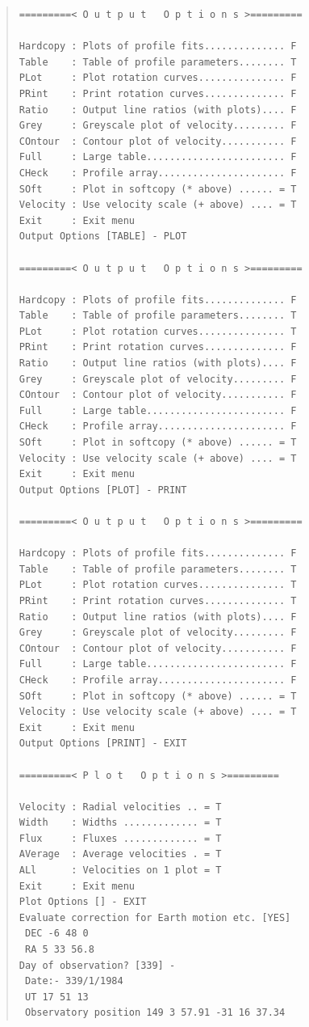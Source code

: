 \documentclass[11pt,twoside]{article}
\begin{document}
\begin{quote}\begin{verbatim}
=========< O u t p u t   O p t i o n s >=========

Hardcopy : Plots of profile fits.............. F
Table    : Table of profile parameters........ T
PLot     : Plot rotation curves............... F
PRint    : Print rotation curves.............. F
Ratio    : Output line ratios (with plots).... F
Grey     : Greyscale plot of velocity......... F
COntour  : Contour plot of velocity........... F
Full     : Large table........................ F
CHeck    : Profile array...................... F
SOft     : Plot in softcopy (* above) ...... = T
Velocity : Use velocity scale (+ above) .... = T
Exit     : Exit menu
Output Options [TABLE] - PLOT

=========< O u t p u t   O p t i o n s >=========

Hardcopy : Plots of profile fits.............. F
Table    : Table of profile parameters........ T
PLot     : Plot rotation curves............... T
PRint    : Print rotation curves.............. F
Ratio    : Output line ratios (with plots).... F
Grey     : Greyscale plot of velocity......... F
COntour  : Contour plot of velocity........... F
Full     : Large table........................ F
CHeck    : Profile array...................... F
SOft     : Plot in softcopy (* above) ...... = T
Velocity : Use velocity scale (+ above) .... = T
Exit     : Exit menu
Output Options [PLOT] - PRINT

=========< O u t p u t   O p t i o n s >=========

Hardcopy : Plots of profile fits.............. F
Table    : Table of profile parameters........ T
PLot     : Plot rotation curves............... T
PRint    : Print rotation curves.............. T
Ratio    : Output line ratios (with plots).... F
Grey     : Greyscale plot of velocity......... F
COntour  : Contour plot of velocity........... F
Full     : Large table........................ F
CHeck    : Profile array...................... F
SOft     : Plot in softcopy (* above) ...... = T
Velocity : Use velocity scale (+ above) .... = T
Exit     : Exit menu
Output Options [PRINT] - EXIT

=========< P l o t   O p t i o n s >=========

Velocity : Radial velocities .. = T
Width    : Widths ............. = T
Flux     : Fluxes ............. = T
AVerage  : Average velocities . = T
ALl      : Velocities on 1 plot = T
Exit     : Exit menu
Plot Options [] - EXIT
Evaluate correction for Earth motion etc. [YES]
 DEC -6 48 0
 RA 5 33 56.8
Day of observation? [339] -
 Date:- 339/1/1984
 UT 17 51 13
 Observatory position 149 3 57.91 -31 16 37.34
\end{verbatim}\end{quote}
\end{document}
